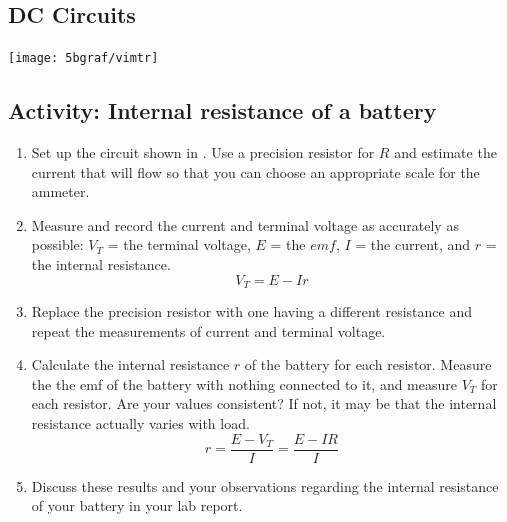 \begin{multicols}{2}
\section {DC Circuits}


\begin{center}
	\texttt{[image: 5bgraf/vimtr]} %
	\label{f:vimtr}
\end{center}

\subsection{Activity: Internal resistance of a battery}
\begin{enumerate}
	 \item Set up the circuit shown in .  Use a precision resistor for $R$ and estimate the current that will flow so that you can choose an appropriate scale for the ammeter.
	\item Measure and record the current and terminal voltage as accurately as possible: $V_T$ = the terminal voltage, $E$ = the $emf$, $I$ = the current, and $r$ = the internal resistance.
\begin{equation} \label{e:vterm}
	V_T  =  E -Ir 	%
\end{equation}
	\item Replace the precision resistor with one having a different resistance and repeat the measurements of current and terminal voltage.
	\item Calculate the internal resistance $r$ of the battery for each resistor. Measure the the emf of the battery with nothing connected to it, and measure $V_T$ for each resistor.  Are your values consistent?  If not, it may be that the internal resistance actually varies with load.
\begin{equation} \label{e:rintern}
	r  =  \dfrac{E - V_T}{I} = \dfrac{E - IR}{I}	%
\end{equation}

	\item Discuss these results and your observations regarding the internal resistance of your battery in your lab report.
\end{enumerate}



\end{multicols}
